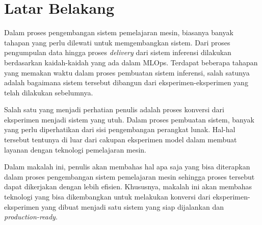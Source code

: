\section{Latar Belakang}

Dalam proses pengembangan sistem pemelajaran mesin, biasanya banyak tahapan yang perlu dilewati untuk memgembangkan sistem.
Dari proses pengumpulan data hingga proses \textit{delivery} dari sistem inferensi dilakukan berdasarkan kaidah-kaidah yang ada dalam MLOps.
Terdapat beberapa tahapan yang memakan waktu dalam proses pembuatan sistem inferensi, salah satunya adalah bagaimana sistem tersebut dibangun dari eksperimen-eksperimen yang telah dilakukan sebelumnya.

Salah satu yang menjadi perhatian penulis adalah proses konversi dari eksperimen menjadi sistem yang utuh.
Dalam proses pembuatan sistem, banyak yang perlu diperhatikan dari sisi pengembangan perangkat lunak.
Hal-hal tersebut tentunya di luar dari cakupan eksperimen model dalam membuat layanan dengan teknologi pemelajaran mesin.

Dalam makalah ini, penulis akan membahas hal apa saja yang bisa diterapkan dalam proses pengembangan sistem pemelajaran mesin sehingga proses tersebut dapat dikerjakan dengan lebih efisien.
Khususnya, makalah ini akan membahas teknologi yang bisa dikembangkan untuk melakukan konversi dari eksperimen-eksperimen yang dibuat menjadi satu sistem yang siap dijalankan dan \textit{production-ready}.